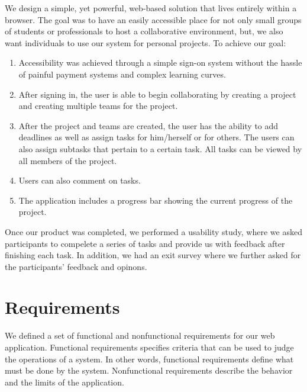 We design a simple, yet powerful, web-based solution that lives entirely within a browser. The goal was to have an easily accessible place for not only small groups of students or professionals to host a collaborative environment, but, we also want individuals to use our system for personal projects. To achieve our goal: 
\begin{enumerate}
	\item Accessibility was achieved through a simple sign-on system without the hassle of painful payment systems and complex learning curves. 
	\item After signing in, the user is able to begin collaborating by creating a project and creating multiple teams for the project. 
	\item After the project and teams are created, the user has the ability to add deadlines as well as assign tasks for him/herself or for others. The users can also assign subtasks that pertain to a certain task. All tasks can be viewed by all members of the project.
	\item Users can also comment on tasks. 
	\item The application includes a progress bar showing the current progress of the project.
\end{enumerate}
Once our product was completed, we performed a usability study, where we asked participants to compelete a series of tasks and provide us with feedback after finishing each task. In addition, we had an exit survey where we further asked for the participants' feedback and opinons.

\section{Requirements}
We defined a set of functional and nonfunctional requirements for our web application. Functional requirements specifies criteria that can be used to judge the operations of a system. In other words, functional requirements define what must be done by the system. Nonfunctional requirements describe the behavior and the limits of the application. 

